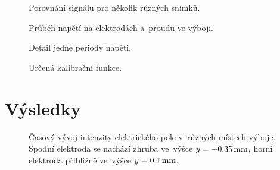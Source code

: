 \begin{figure}[htp]
	\centering
	
	\caption{Porovnání signálu \EFISH{} pro několik různých snímků.}
	\label{fig:efish-singleshots-compare}
\end{figure}

\begin{figure}[htp]
	\centering
	
	\caption{Průběh napětí na elektrodách a~proudu ve výboji.}
	\label{fig:efish-overview-full}
\end{figure}

\begin{figure}[htp]
	\centering
	
	\caption{Detail jedné periody napětí.}
	\label{fig:efish-overview-period}
\end{figure}

\begin{figure}
	
	\caption{Určená kalibrační funkce.}
\end{figure}

\section{Výsledky}
\label{sec:efish-results}

\begin{figure}[p]
	\makebox[\textwidth]{}
	\caption{Časový vývoj intenzity elektrického pole
		v~různých místech výboje.
		Spodní elektroda se nachází zhruba ve~výšce
		$y = \SI{-0.35}{\milli\metre}$,
		horní elektroda přibližně ve~výšce
		$y = \SI{0.7}{\milli\metre}$.}
\end{figure}
